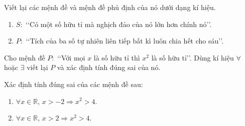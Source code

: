 \begin{bt}[Mức độ 2]%
Viết lại các mệnh đề và mệnh đề phủ định của nó dưới dạng kí hiệu.
\begin{enumerate}
\item $S\colon$ \lq\lq Có một số hữu tỉ mà nghịch đảo của nó lớn hơn chính nó\rq\rq.
\item $P\colon$ \lq\lq Tích của ba số tự nhiên liên tiếp bất kì luôn chia hết cho sáu\rq\rq.
\end{enumerate}
\end{bt}

\begin{bt}[Mức độ 2]%
Cho mệnh đề $P\colon $ \lq\lq Với mọi $x$ là số hữu tỉ thì $x^2$ là số hữu tỉ\rq\rq. Dùng kí hiệu $\forall$ hoặc $\exists$ viết lại $P$ và xác định tính đúng sai của nó.
\end{bt}

\begin{bt}[Mức độ 2]%
Xác định tính đúng sai của các mệnh đề sau:
\begin{enumerate}
\item $\forall x\in \mathbb{R},\, x>-2 \Rightarrow x^2>4$.
\item $\forall x\in \mathbb{R},\, x>2 \Rightarrow x^2>4$.
\end{enumerate}
\end{bt}

